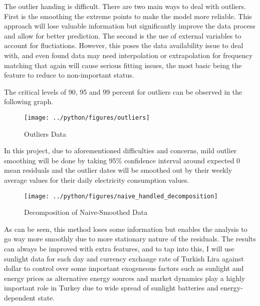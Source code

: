 \documentclass[11pt, a4paper, leqno]{article}
\begin{document}
The outlier handing is difficult. There are two main ways to deal with outliers. First is the smoothing the extreme points to make the model more reliable. This approach will lose valuable information but significantly improve the data process and allow for better prediction. The second is the use of external variables to account for fluctiations. However, this poses the data availability issue to deal with, and even found data may need interpolation or extrapolation for frequency matching that again will cause serious fitting issues, the most basic being the feature to reduce to non-important status.


The critical levels of 90, 95 and 99 percent for outliers can be observed in the following graph.

\begin{figure}[H]

    \centering
    \texttt{[image: ../python/figures/outliers]}

    \caption{Outliers Data}
    \label{fig:daily_consumption}

\end{figure}

In this project, due to aforementioned difficulties and concerns, mild outlier smoothing will be done by taking 95\% confidence interval around expected 0 mean residuals and the outlier dates will be smoothed out by their weekly average values for their daily electricity consumption values.


\begin{figure}[H]

    \centering
    \texttt{[image: ../python/figures/naive\_handled\_decomposition]}

    \caption{Decomposition of Naive-Smoothed Data}
    \label{fig:daily_consumption}

\end{figure}

As can be seen, this method loses some information but enables the analysis to go way more smoothly due to more stationary nature of the residuals.
The results can always be improved with extra features, and to tap into this, I will use sunlight data for each day and currency exchange rate of Turkish Lira against dollar to control over some important exogeneous factors such as sunlight and energy prices as alternative energy sources and market dynamics play a highly important role in Turkey due to wide spread of sunlight batteries and energy-dependent state.
\end{document}
